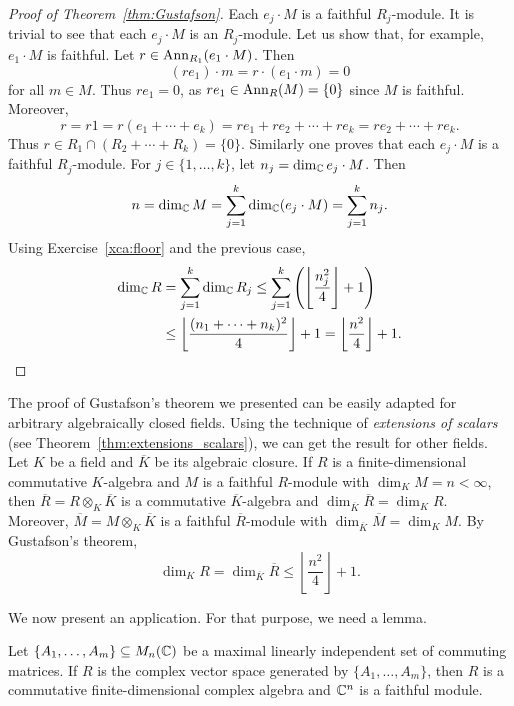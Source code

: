 \begin{proof}[Proof of Theorem~\ref{thm:Gustafson}]
    Each $e_j\cdot M$ is a faithful $R_j$-module. It is trivial to see that each 
    $e_j\cdot M$ is an $R_j$-module. 
    Let us show that, for example, $e_1\cdot M$ is faithful. Let $r\in\operatorname{Ann}_{R_1}(e_1\cdot M)$. Then
    \[
    (re_1)\cdot m=r\cdot (e_1\cdot m)=0
    \]
    for all $m\in M$. Thus $re_1=0$, as $re_1\in\operatorname{Ann}_R(M)=\{0\}$ since $M$ is faithful. Moreover, 
    \[
    r=r1=r(e_1+\cdots+e_k)=re_1+re_2+\cdots+re_k=re_2+\cdots+re_k.
    \]
    Thus $r\in R_1\cap (R_2+\cdots+R_k)=\{0\}$. Similarly one proves that each $e_j\cdot M$ is a faithful $R_j$-module. 
    For $j\in\{1,\dots,k\}$, let $n_j=\dim_{\mathbb{C}}e_j\cdot M$. Then 
    \[
    n=\dim_{\mathbb{C}}M=\sum_{j=1}^k\dim_{\mathbb{C}}(e_j\cdot M)=\sum_{j=1}^kn_j.
    \]
    Using Exercise~\ref{xca:floor} and the previous case, 
    \begin{align*}
    \dim_{\mathbb{C}}R&=\sum_{j=1}^k\dim_{\mathbb{C}}R_j
    \leq\sum_{j=1}^k \left(\left\lfloor \frac{n_j^2}{4}\right\rfloor+1\right)\\
    &\leq\left\lfloor\frac{(n_1+\cdots+n_k)^2}{4}\right\rfloor+1
    =\left\lfloor\frac{n^2}{4}\right\rfloor+1.\qedhere     
    \end{align*}
\end{proof}

The proof of Gustafson's theorem we presented 
can be easily adapted for arbitrary algebraically closed fields. Using the technique of \emph{extensions 
of scalars} (see Theorem~\ref{thm:extensions_scalars}), 
we can get the result for other fields. Let $K$ be a field and $\overline{K}$ be its algebraic closure. 
If $R$ is a finite-dimensional commutative 
$K$-algebra and $M$ is a faithful $R$-module with $\dim_KM=n<\infty$, then 
$\overline{R}=R\otimes_K\overline{K}$ is a commutative $\overline{K}$-algebra and
$\dim_{\overline{K}}\overline{R}=\dim_KR$. Moreover, $\overline{M}=M\otimes_K\overline{K}$ is a faithful
$\overline{R}$-module with 
$\dim_{\overline{K}}\overline{M}=\dim_KM$. By Gustafson's theorem, 
\[
\dim_KR=\dim_{\overline{K}}\overline{R}\leq\left\lfloor\frac{n^2}{4}\right\rfloor+1.
\]

We now present an application. For that purpose, we need a lemma.

\begin{lemma}
\label{lem:Gustafson}
    Let $\{A_1,\dots,A_m\}\subseteq M_n(\mathbb{C})$ be a maximal linearly independent set of
    commuting matrices. If $R$ is the complex vector space
    generated by $\{A_1,\dots,A_m\}$, then $R$ 
    is a commutative finite-dimensional complex 
    algebra and $\mathbb{C}^n$ is a faithful module. 
\end{lemma}

